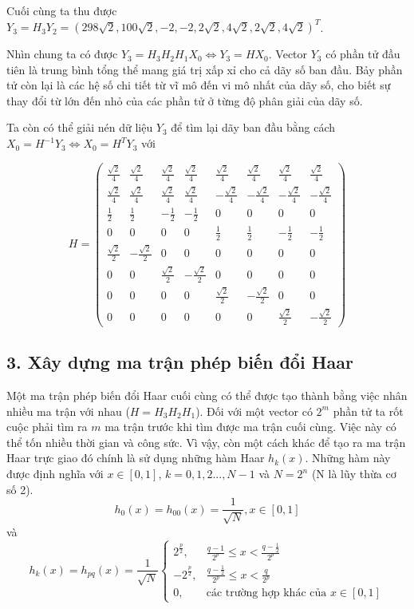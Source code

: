 Cuối cùng ta thu được $Y_{3} = H_3 Y_2 = (298\sqrt{2}, 100\sqrt{2}, -2, -2, 2\sqrt{2}, 4\sqrt{2}, 2\sqrt{2}, 4\sqrt{2})^T$.

Nhìn chung ta có được $Y_3=H_3H_2H_1X_0 \iff Y_3=HX_0$. Vector $Y_3$ có phần tử đầu tiên là trung bình tổng thể mang giá trị xấp xỉ cho
cả dãy số ban đầu. Bảy phần tử còn lại là các hệ số chi tiết từ vĩ mô đến vi mô nhất của dãy số, cho biết sự thay đổi từ lớn đến nhỏ của các phần tử ở từng độ phân giải của dãy số.

Ta còn có thể giải nén dữ liệu $Y_3$ để tìm lại dãy ban đầu bằng cách $X_0=H^{-1}Y_3 \iff X_0=H^TY_3$ với 

\begin{center}
    $$H = \begin{pmatrix}
        \frac{\sqrt{2}}{4} &  \frac{\sqrt{2}}{4} &  \frac{\sqrt{2}}{4} &  \frac{\sqrt{2}}{4} &  \frac{\sqrt{2}}{4} &  \frac{\sqrt{2}}{4} &  \frac{\sqrt{2}}{4} &  \frac{\sqrt{2}}{4} \\
        \frac{\sqrt{2}}{4} &  \frac{\sqrt{2}}{4} &  \frac{\sqrt{2}}{4} &  \frac{\sqrt{2}}{4} & -\frac{\sqrt{2}}{4} & -\frac{\sqrt{2}}{4} & -\frac{\sqrt{2}}{4} & -\frac{\sqrt{2}}{4} \\
        \frac{1}{2} &  \frac{1}{2} & -\frac{1}{2} & -\frac{1}{2} &  0 &  0 &  0 &  0 \\
        0 &  0 &  0 &  0 &  \frac{1}{2} &  \frac{1}{2} & -\frac{1}{2} & -\frac{1}{2} \\
        \frac{\sqrt{2}}{2} & -\frac{\sqrt{2}}{2} &  0 &  0 &  0 &  0 &  0 &  0 \\
        0 &  0 &  \frac{\sqrt{2}}{2} & -\frac{\sqrt{2}}{2} &  0 &  0 &  0 &  0 \\
        0 &  0 &  0 &  0 &  \frac{\sqrt{2}}{2} & -\frac{\sqrt{2}}{2} &  0 &  0 \\
        0 &  0 &  0 &  0 &  0 &  0 &  \frac{\sqrt{2}}{2} & -\frac{\sqrt{2}}{2}
    \end{pmatrix}$$
\end{center}
\subsection*{3. Xây dựng ma trận phép biến đổi Haar}

Một ma trận phép biến đổi Haar cuối cùng có thể được tạo thành bằng việc nhân nhiều ma trận với nhau ($H=H_3H_2H_1$).
Đối với một vector có $2^m$ phần tử ta rốt cuộc phải tìm ra $m$ ma trận trước khi tìm được ma trận cuối cùng. Việc này có thể tốn nhiều thời gian và công sức.
Vì vậy, còn một cách khác để tạo ra ma trận Haar trực giao
đó chính là sử dụng những hàm Haar $h_k(x)$. Những hàm này được định nghĩa với $x \in [0,1]$, $k=0,1,2...,N-1$ và $N=2^n$ (N là lũy thừa cơ số 2).
$$h_0(x)=h_{00}(x)=\frac{1}{\sqrt{N}}, x \in [0,1]$$
và 
$$h_k(x) = h_{pq}(x) = \frac{1}{\sqrt{N}}
\begin{cases} 
    2^{\frac{p}{2}}, & \frac{q-1}{2^p} \leq x < \frac{q-\frac{1}{2}}{2^p} \\[2ex]
    -2^{\frac{p}{2}}, & \frac{q-\frac{1}{2}}{2^p} \leq x < \frac{q}{2^p} \\[2ex]
    0, & \text{các trường hợp khác của } x \in [0, 1]
\end{cases}$$

